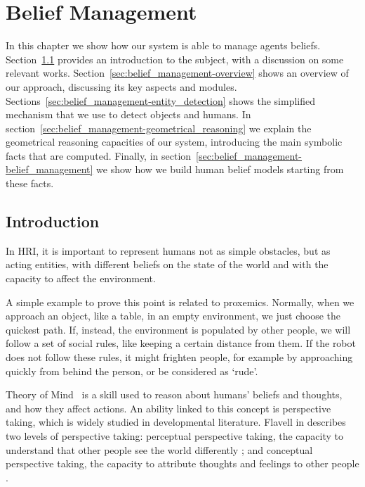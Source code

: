 
\chapter{Belief Management} %

\label{chapter:belief_management} %


In this chapter we show how our system is able to manage agents beliefs. Section~\ref{sec:belief_management-intro} provides an introduction to the subject, with a discussion on some relevant works. Section~\ref{sec:belief_management-overview} shows an overview of our approach, discussing its key aspects and modules. Sections~\ref{sec:belief_management-entity_detection}  shows the simplified mechanism that we use to detect objects and humans. In section~\ref{sec:belief_management-geometrical_reasoning} we explain the geometrical reasoning capacities of our system, introducing the main symbolic facts that are computed. Finally, in section~\ref{sec:belief_management-belief_management} we show how we build human belief models starting from these facts.

\section{Introduction}
\label{sec:belief_management-intro}

In HRI, it is important to represent humans not as simple obstacles, but as acting entities, with different beliefs on the state of the world and with the capacity to affect the environment. 

A simple example to prove this point is related to proxemics. Normally, when we approach an object, like a table, in an empty environment, we just choose the quickest path. If, instead, the environment is populated by other people, we will follow a set of social rules, like keeping a certain distance from them. If the robot does not follow these rules, it might frighten people, for example by approaching quickly from behind the person, or be considered as `rude'.


Theory of Mind~\citep{premack1978does} is a skill used to reason about humans' beliefs and thoughts, and how they affect actions. An ability linked to this concept is perspective taking, which is widely studied in developmental literature.  Flavell in \cite{flavell1977development} describes two levels of perspective taking: 
perceptual perspective taking, the capacity to understand that other people see the world differently \citep{Tversky1999}; and conceptual perspective taking, the capacity to attribute thoughts and feelings to other people \citep{Baron1985}. 

